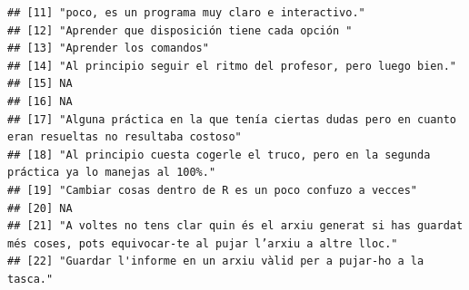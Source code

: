 \documentclass[
]{article}
\begin{document}
\begin{verbatim}
## [11] "poco, es un programa muy claro e interactivo."                                                                                                                                                                                
## [12] "Aprender que disposición tiene cada opción "                                                                                                                                                                                  
## [13] "Aprender los comandos"                                                                                                                                                                                                        
## [14] "Al principio seguir el ritmo del profesor, pero luego bien."                                                                                                                                                                  
## [15] NA                                                                                                                                                                                                                             
## [16] NA                                                                                                                                                                                                                             
## [17] "Alguna práctica en la que tenía ciertas dudas pero en cuanto eran resueltas no resultaba costoso"                                                                                                                             
## [18] "Al principio cuesta cogerle el truco, pero en la segunda práctica ya lo manejas al 100%."                                                                                                                                     
## [19] "Cambiar cosas dentro de R es un poco confuzo a vecces"                                                                                                                                                                        
## [20] NA                                                                                                                                                                                                                             
## [21] "A voltes no tens clar quin és el arxiu generat si has guardat més coses, pots equivocar-te al pujar l’arxiu a altre lloc."                                                                                                    
## [22] "Guardar l'informe en un arxiu vàlid per a pujar-ho a la tasca."                                                                                                                                                               

\end{verbatim}
\end{document}
